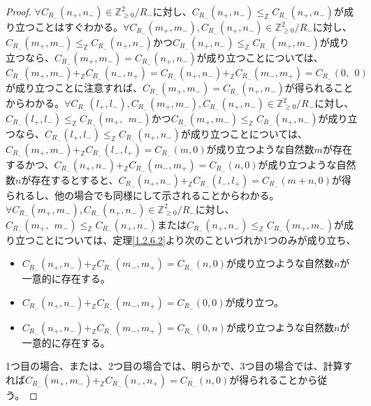 \documentclass[dvipdfmx]{jsarticle}
\begin{document}
\begin{proof}
$\forall C_{R_{-}}\left( n_{+},n_{-} \right) \in \mathbb{Z}_{\geq 0}^{2} /R_{-} $に対し、$C_{R_{-}}\left( n_{+},n_{-} \right) \leq_{\mathbb{Z}}C_{R_{-}}\left( n_{+},n_{-} \right)$が成り立つことはすぐわかる。$\forall C_{R_{-}}\left( m_{+},m_{-} \right),C_{R_{-}}\left( n_{+},n_{-} \right) \in \mathbb{Z}_{\geq 0}^{2} /R_{-} $に対し、$C_{R_{-}}\left( m_{+},m_{-} \right) \leq_{\mathbb{Z}}C_{R_{-}}\left( n_{+},n_{-} \right)$かつ$C_{R_{-}}\left( n_{+},n_{-} \right) \leq_{\mathbb{Z}}C_{R_{-}}\left( m_{+},m_{-} \right)$が成り立つなら、$C_{R_{-}}\left( m_{+},m_{-} \right) = C_{R_{-}}\left( n_{+},n_{-} \right)$が成り立つことについては、$C_{R_{-}}\left( m_{+},m_{-} \right) +_{\mathbb{Z}}C_{R_{-}}\left( n_{-},n_{+} \right) = C_{R_{-}}\left( n_{+},n_{-} \right) +_{\mathbb{Z}}C_{R_{-}}\left( m_{-},m_{+} \right) = C_{R_{-}}(0,\ \ 0)$が成り立つことに注意すれば、$C_{R_{-}}\left( m_{+},m_{-} \right) = C_{R_{-}}\left( n_{+},n_{-} \right)$が得られることからわかる。$\forall C_{R_{-}}\left( l_{+},l_{-} \right),C_{R_{-}}\left( m_{+},m_{-} \right),C_{R_{-}}\left( n_{+},n_{-} \right) \in \mathbb{Z}_{\geq 0}^{2} /R_{-} $に対し、$C_{R_{-}}\left( l_{+},l_{-} \right) \leq_{\mathbb{Z}}C_{R_{-}}\left( m_{+},\ \ m_{-} \right)$かつ$C_{R_{-}}\left( m_{+},m_{-} \right) \leq_{\mathbb{Z}}C_{R_{-}}\left( n_{+},n_{-} \right)$が成り立つなら、$C_{R_{-}}\left( l_{+},l_{-} \right) \leq_{\mathbb{Z}}C_{R_{-}}\left( n_{+},n_{-} \right)$が成り立つことについては、$C_{R_{-}}\left( m_{+},m_{-} \right) +_{\mathbb{Z}}C_{R_{-}}\left( l_{-},l_{+} \right) = C_{R_{-}}(m,0)$が成り立つような自然数$m$が存在するかつ、$C_{R_{-}}\left( n_{+},n_{-} \right) +_{\mathbb{Z}}C_{R_{-}}\left( m_{-},m_{+} \right) = C_{R_{-}}(n,0)$が成り立つような自然数$n$が存在するとすると、$C_{R_{-}}\left( n_{+},n_{-} \right) +_{\mathbb{Z}}C_{R_{-}}\left( l_{-},l_{+} \right) = C_{R_{-}}(m + n,0)$が得られるし、他の場合でも同様にして示されることからわかる。$\forall C_{R_{-}}\left( m_{+},m_{-} \right),C_{R_{-}}\left( n_{+},n_{-} \right) \in \mathbb{Z}_{\geq 0}^{2} /R_{-} $に対し、$C_{R_{-}}\left( m_{+},\ \ m_{-} \right) \leq_{\mathbb{Z}}C_{R_{-}}\left( n_{+},n_{-} \right)$または$C_{R_{-}}\left( n_{+},n_{-} \right) \leq_{\mathbb{Z}}C_{R_{-}}\left( m_{+},m_{-} \right)$が成り立つことについては、定理\ref{1.2.6.2}より次のこといづれか1つのみが成り立ち、
\begin{itemize}
\item
  $C_{R_{-}}\left( n_{+},n_{-} \right) +_{\mathbb{Z}}C_{R_{-}}\left( m_{-},m_{+} \right) = C_{R_{-}}(n,0)$が成り立つような自然数$n$が一意的に存在する。
\item
  $C_{R_{-}}\left( n_{+},n_{-} \right) +_{\mathbb{Z}}C_{R_{-}}\left( m_{-},m_{+} \right) = C_{R_{-}}(0,0)$が成り立つ。
\item
  $C_{R_{-}}\left( n_{+},n_{-} \right) +_{\mathbb{Z}}C_{R_{-}}\left( m_{-},m_{+} \right) = C_{R_{-}}(0,n)$が成り立つような自然数$n$が一意的に存在する。
\end{itemize}
1つ目の場合、または、2つ目の場合では、明らかで、3つ目の場合では、計算すれば$C_{R_{-}}\left( m_{+},m_{-} \right) +_{\mathbb{Z}}C_{R_{-}}\left( n_{-},n_{+} \right) = C_{R_{-}}(n,0)$が得られることから従う。
\end{proof}
\end{document}
